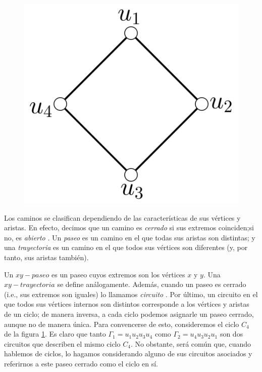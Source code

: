 \begin{figure}
\centering
\includegraphics[scale=0.2]{img/imgchapter1/GrafoCiclo.jpg}
\caption{}
\label{fig:cicloc4}
\vspace{-0.5cm}
\end{figure}
Los caminos se clasifican dependiendo de las características de sus vértices y aristas. En efecto, decimos que un camino es \textit{cerrado}  si sus extremos coinciden;si no, es \textit{abierto} . Un \textit{paseo}  es un camino en el que todas sus aristas son distintas; y una \textit{trayectoria}  es un camino en el que todos sus vértices son diferentes (y, por tanto, sus aristas también). 


Un $xy-paseo$ es un paseo cuyos extremos son los vértices $x$ y $y$. Una $xy-trayectoria$ se define análogamente. Además, cuando un paseo es cerrado (i.e., sus extremos son iguales) lo llamamos \textit{circuito} . Por último, un circuito en el que todos sus vértices internos son distintos corresponde a los vértices y aristas de un ciclo; de manera inversa, a cada ciclo podemos asignarle un paseo cerrado, aunque no de manera única. Para convencerse de esto, consideremos el ciclo $C_{4}$ de la figura \ref{fig:cicloc4}. Es claro que tanto $\Gamma_{1} = u_{1}u_{2}u_{3}u_{4}$ como $\Gamma_{2} = u_{4}u_{3}u_{2}u_{1}$ son dos circuitos que describen el mismo ciclo $C_{4}$. No obstante, será común que, cuando hablemos de ciclos, lo hagamos considerando alguno de sus circuitos asociados y referirnos a este paseo cerrado como el ciclo en sí. 

